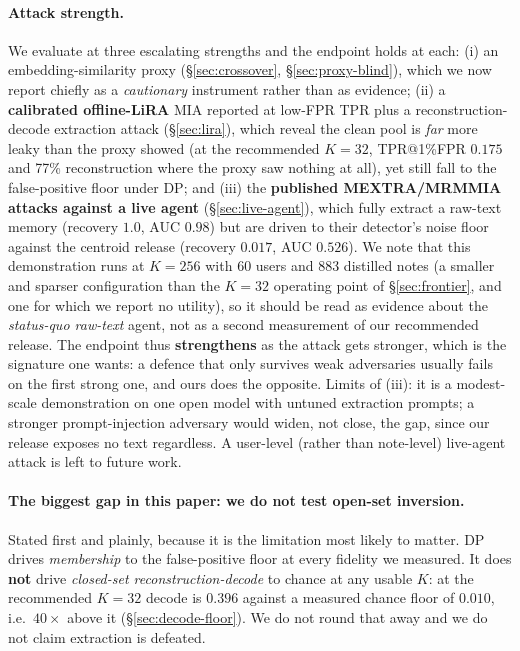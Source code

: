 \documentclass[pdflatex,sn-mathphys-num,iicol]{sn-jnl}
\theoremstyle{thmstyleone}%
\theoremstyle{thmstyletwo}%
\theoremstyle{thmstylethree}%
\newcommand{\secref}[1]{\S\ref{#1}}
\begin{document}
\paragraph{Attack strength.} We evaluate at three escalating strengths and the endpoint holds at
each: (i) an embedding-similarity proxy (\secref{sec:crossover}, \secref{sec:proxy-blind}), which
we now report chiefly as a \emph{cautionary} instrument rather than as evidence; (ii) a
\textbf{calibrated offline-LiRA} MIA reported at low-FPR TPR plus a reconstruction-decode
extraction attack (\secref{sec:lira}), which reveal the clean pool is \emph{far} more leaky than
the proxy showed (at the recommended $K = 32$, TPR@1\%FPR $0.175$ and 77\% reconstruction where
the proxy saw nothing at all), yet still fall to the false-positive floor under DP; and (iii) the
\textbf{published MEXTRA/MRMMIA attacks against a live agent} (\secref{sec:live-agent}), which
fully extract a raw-text memory (recovery $1.0$, AUC $0.98$) but are driven to their detector's noise
floor against the centroid release (recovery $0.017$, AUC $0.526$). We note that this demonstration runs
at $K = 256$ with 60 users and 883 distilled notes (a smaller and sparser configuration than the
$K = 32$ operating point of \secref{sec:frontier}, and one for which we report no utility), so it
should be read as evidence about the \emph{status-quo raw-text} agent, not as a second measurement of
our recommended release. The endpoint thus \textbf{strengthens} as the attack gets stronger, which is the
signature one wants: a defence that only survives weak adversaries usually fails on the first
strong one, and ours does the opposite. Limits of (iii): it is a modest-scale demonstration on one
open model with untuned extraction prompts; a stronger prompt-injection adversary would widen, not
close, the gap, since our release exposes no text regardless. A user-level (rather than note-level)
live-agent attack is left to future work.

\paragraph{The biggest gap in this paper: we do not test open-set inversion.} Stated first and
plainly, because it is the limitation most likely to matter. DP drives \emph{membership} to the
false-positive floor at every fidelity we measured. It does \textbf{not} drive
\emph{closed-set reconstruction-decode} to chance at any usable $K$: at the recommended
$K = 32$ decode is $0.396$ against a measured chance floor of $0.010$, i.e.\ $40\times$ above
it (\secref{sec:decode-floor}). We do not round that away and we do not claim extraction is
defeated.
\end{document}
